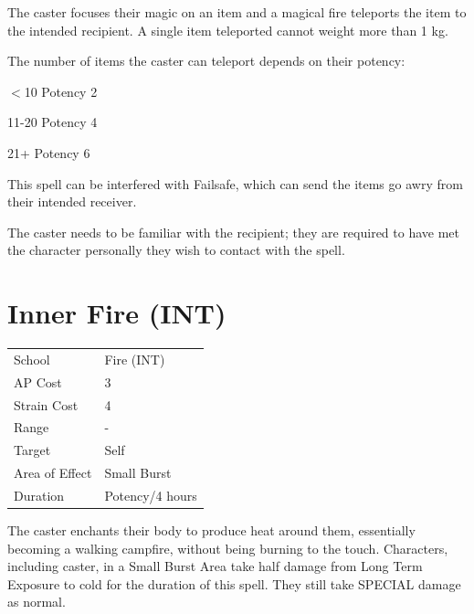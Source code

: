 \documentclass[11pt,a4paper,twocolumn]{book}
\begin{document}
	\medskip
	
	The caster focuses their magic on an item and a magical fire teleports the item to the intended recipient. A single item teleported cannot weight more than 1 kg.
	
	The number of items the caster can teleport depends on their potency:
	
	\begin{compactitem}
		\item $<$10 Potency 		2
		\item 11-20 Potency 		4
		\item 21+ Potency 			6
	\end{compactitem}
	
	This spell can be interfered with Failsafe, which can send the items go awry from their intended receiver.
	
	The caster needs to be familiar with the recipient; they are required to have met the character personally they wish to contact with the spell.
	
		\section*{Inner Fire (INT)}
	{
		\begin{tabu} to 75mm{| X[l,4] | X[l,7] |}
			\hline
			School 			&  Fire (INT)			\\
			AP Cost	      	&  3					\\
			Strain Cost     &  4					\\
			Range     		&  -					\\
			Target      	&  Self					\\
			Area of Effect  &  Small Burst	 		\\
			Duration     	&  Potency/4 hours		\\ \hline
		\end{tabu}
		
	}
	
	\medskip
	
	The caster enchants their body to produce heat around them, essentially becoming a walking campfire, without being burning to the touch. Characters, including caster, in a Small Burst Area take half damage from Long Term Exposure to cold for the duration of this spell. They still take SPECIAL damage as normal.
	
\end{document}
